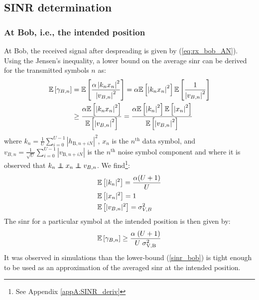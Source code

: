 \subsection{SINR determination}
\subsubsection{At Bob, i.e., the intended position}
At Bob, the received signal after despreading is given by (\ref{eq:rx_bob_AN}). Using the Jensen's inequality, a lower bound on the average \gls{sinr} can be derived for the transmitted symbols $n$ as:
\begin{equation}
\begin{split}
    \mathbb{E} \left[\gamma_{B,n}\right] &= \mathbb{E} \left[ \frac{  \alpha \left| k_n x_n \right|^2  }{  \left| v_{B,n} \right|^2} \right]  = \alpha \mathbb{E} \left[\left| k_n  x_n\right|^2\right]  \mathbb{E} \left[\frac{1}{\left| v_{B,n} \right|^2}\right]  \\
    & \geq  \frac{\alpha \mathbb{E} \left[  \left| k_n  x_n\right|^2 \right] }{\mathbb{E} \left[ \left| v_{B,n} \right|^2 \right]} =  \frac{\alpha \mathbb{E} \left[ \left| k_n \right|^2 \right] \mathbb{E} \left[ \left| x_n \right|^2 \right] }{\mathbb{E} \left[ \left| v_{B,n} \right|^2 \right]}
    \label{eq:RV_sinr_b}
\end{split}
\end{equation}
where $k_n = \frac{1}{U}\sum_{i=0}^{U-1} \left| h_{\text{B}, n + iN}\right|^2$, $x_n$ is the $n^{\text{th}}$ data symbol, and $v_{B,n} = \frac{1}{\sqrt{U}}\sum_{i=0}^{U-1} \left| v_{\text{B}, n + iN}\right|$ is the $n^{\text{th}}$ noise symbol component and where it is observed that $k_n \independent x_n \independent v_{B,n}$.
We find\footnote{See Appendix \ref{appA:SINR_deriv}}:
\begin{equation}
    \begin{split}
        &\mathbb{E} \left[|k_n|^2\right] = \frac{\alpha(U+1)}{U} \\
        &\mathbb{E} \left[|x_n|^2\right] = 1\\
        &\mathbb{E} \left[|v_{B,n}|^2\right] = \sigma^2_{V,B}
    \end{split}
    \label{eq:expected_bob}
\end{equation}
The \gls{sinr} for a particular symbol at the intended position is then given by:
\begin{equation}
    \mathbb{E} \left[\gamma_{B,n}\right] \geq \frac{\alpha \;(U+1)}{U \; \sigma_{\text{V,B}}^2}
    \label{sinr_bob}
\end{equation}
It was observed in simulations than the lower-bound (\ref{sinr_bob}) is tight enough to be used as an approximation of the averaged \gls{sinr} at the intended position. 





